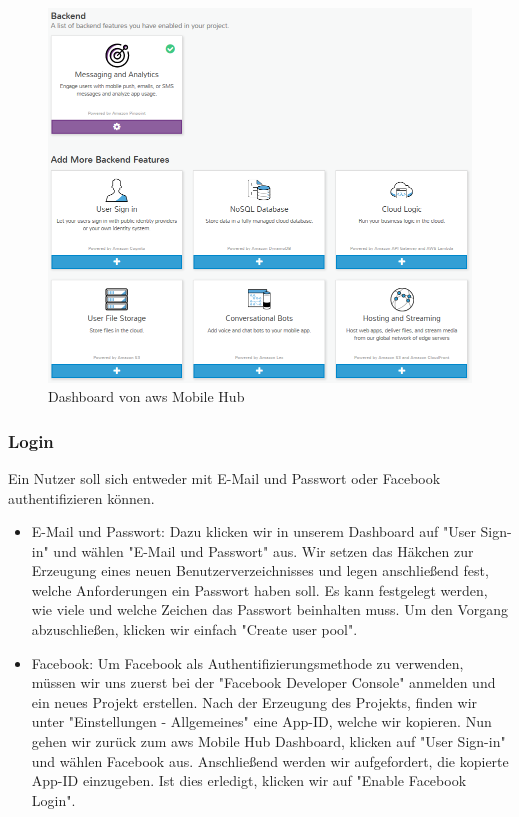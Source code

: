 \begin{figure}[h!]
	\centering
	\includegraphics[width=1\linewidth]{Pictures/MobileHubBackendOverview}
	\caption[Dashboard von \gls{aws} Mobile Hub]{Dashboard von \gls{aws} Mobile Hub}
	\label{fig:mobilehubbackendoverview}
\end{figure}

\subsubsection{Login}
Ein Nutzer soll sich entweder mit E-Mail und Passwort oder Facebook authentifizieren können. 

\begin{itemize}
	\item E-Mail und Passwort:
	Dazu klicken wir in unserem Dashboard auf "User Sign-in" und wählen "E-Mail und Passwort" aus. Wir setzen das Häkchen zur Erzeugung eines neuen Benutzerverzeichnisses und legen anschließend fest, welche Anforderungen ein Passwort haben soll. Es kann festgelegt werden, wie viele und welche Zeichen das Passwort beinhalten muss. Um den Vorgang abzuschließen, klicken wir einfach "Create user pool".
	\item Facebook:
	Um Facebook als Authentifizierungsmethode zu verwenden, müssen wir uns zuerst bei der "Facebook Developer Console" anmelden und ein neues Projekt erstellen. Nach der Erzeugung des Projekts, finden wir unter "Einstellungen - Allgemeines" eine App-ID, welche wir kopieren. Nun gehen wir zurück zum \gls{aws} Mobile Hub Dashboard, klicken auf "User Sign-in" und wählen Facebook aus. Anschließend werden wir aufgefordert, die kopierte App-ID einzugeben. Ist dies erledigt, klicken wir auf "Enable Facebook Login".
\end{itemize}

